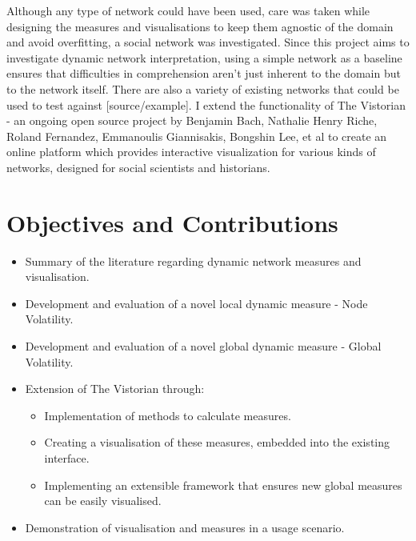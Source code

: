 Although any type of network could have been used, care was taken while designing the measures and visualisations to keep them agnostic of the domain and avoid overfitting, a social network was investigated. 
Since this project aims to investigate dynamic network interpretation, using a simple network as a baseline ensures that difficulties in comprehension aren’t just inherent to the domain but to the network itself. There are also a variety of existing networks that could be used to test against [source/example].
I extend the functionality of The Vistorian \cite{bach:hal-01205822} - an ongoing open source project by Benjamin Bach, Nathalie Henry Riche, Roland Fernandez, Emmanoulis Giannisakis, Bongshin Lee, et al to create an online platform which provides interactive visualization for various kinds of networks, designed for social scientists and historians. 



\section{Objectives and Contributions}
\label{objectives}
\begin{itemize}
    \item Summary of the literature regarding dynamic network measures and visualisation.
    \item Development and evaluation of a novel local dynamic measure - Node Volatility.
    \item Development and evaluation of a novel global dynamic measure - Global Volatility.
    \item Extension of The Vistorian through:
    \begin{itemize}
        \item Implementation of methods to calculate measures.
        \item Creating a visualisation of these measures, embedded into the existing interface.
        \item Implementing an extensible framework that ensures new global measures can be easily visualised.
    \end{itemize}
    \item Demonstration of visualisation and measures in a usage scenario.


\end{itemize}





